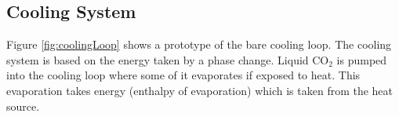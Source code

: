 \subsection{Cooling System}
Figure \ref{fig:coolingLoop} shows a prototype of the bare cooling loop. The cooling system is based on the energy taken by a phase change. Liquid $\text{CO}_2$ is pumped into the cooling loop where some of it evaporates if exposed to heat. This evaporation takes energy (enthalpy of evaporation) which is taken from the heat source.
\clearpage